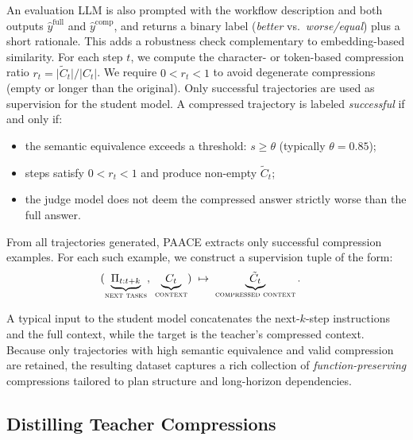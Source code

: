 \documentclass{article}
\theoremstyle{plain}
\theoremstyle{definition}
\theoremstyle{remark}
\begin{document}
An evaluation LLM is also prompted with the workflow description and both outputs
\(\hat{y}^{\mathrm{full}}\) and \(\hat{y}^{\mathrm{comp}}\), and returns a binary label
(\emph{better} vs.\ \emph{worse/equal}) plus a short rationale.
This adds a robustness check complementary to embedding-based similarity. For each step \(t\), we compute the character- or token-based compression ratio
$r_t = \lvert \tilde{C}_t \rvert / \lvert C_t \rvert$. We require \(0 < r_t < 1\) to avoid degenerate compressions (empty or longer than the original). Only successful trajectories are used as supervision for the student model. A compressed trajectory is labeled \emph{successful} if and only if:
\vspace{-4pt}
\begin{itemize}\setlength{\itemsep}{0pt}\setlength{\parskip}{0pt}\setlength{\parsep}{0pt}
    \item the semantic equivalence exceeds a threshold: \(s \ge \theta\) (typically \(\theta = 0.85\));
    \item steps satisfy \(0 < r_t < 1\) and produce non-empty \(\tilde{C}_t\);
    \item the judge model does not deem the compressed answer strictly worse than the full answer.
\end{itemize}




From all trajectories generated, PAACE extracts only successful compression
examples. For each such example, we construct a supervision tuple of the form:
\begin{equation}
\begin{aligned}
(\underbrace{\Pi_{t:t+k}}_{\textsc{next tasks}},\;
 \underbrace{C_t}_{\textsc{context}})
&\;\mapsto\;
\underbrace{\tilde{C}_t}_{\textsc{compressed context}} .
\end{aligned}
\end{equation}

A typical input to the student model concatenates the next-\(k\)-step instructions
and the full context, while the target is the teacher's compressed context. Because only trajectories with high semantic equivalence and valid compression are retained, the
resulting dataset captures a rich collection of \emph{function-preserving} compressions tailored to plan structure and long-horizon dependencies.

\subsection{Distilling Teacher Compressions}
\end{document}
